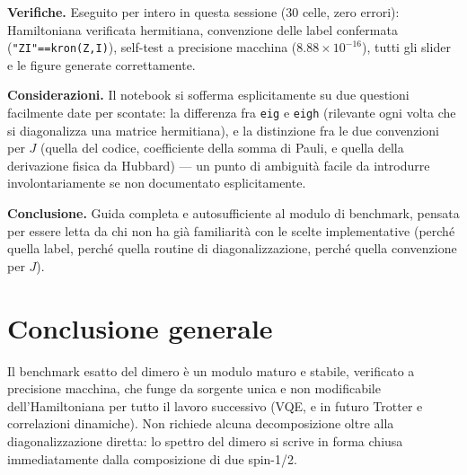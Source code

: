 \documentclass[11pt,a4paper]{article}
\begin{document}
\textbf{Verifiche.} Eseguito per intero in questa sessione (30 celle, zero errori):
Hamiltoniana verificata hermitiana, convenzione delle label confermata
(\texttt{"ZI"==kron(Z,I)}), self-test a precisione macchina
($8.88\times10^{-16}$), tutti gli slider e le figure generate correttamente.

\textbf{Considerazioni.} Il notebook si sofferma esplicitamente su due questioni
facilmente date per scontate: la differenza fra \texttt{eig} e \texttt{eigh}
(rilevante ogni volta che si diagonalizza una matrice hermitiana), e la distinzione
fra le due convenzioni per $J$ (quella del codice, coefficiente della somma di Pauli,
e quella della derivazione fisica da Hubbard) — un punto di ambiguità facile da
introdurre involontariamente se non documentato esplicitamente.

\textbf{Conclusione.} Guida completa e autosufficiente al modulo di benchmark,
pensata per essere letta da chi non ha già familiarità con le scelte implementative
(perché quella label, perché quella routine di diagonalizzazione, perché quella
convenzione per $J$).

\section*{Conclusione generale}

Il benchmark esatto del dimero è un modulo maturo e stabile, verificato a precisione
macchina, che funge da sorgente unica e non modificabile dell'Hamiltoniana per tutto
il lavoro successivo (VQE, e in futuro Trotter e correlazioni dinamiche). Non
richiede alcuna decomposizione oltre alla diagonalizzazione diretta: lo spettro del
dimero si scrive in forma chiusa immediatamente dalla composizione di due spin-1/2.
\end{document}
